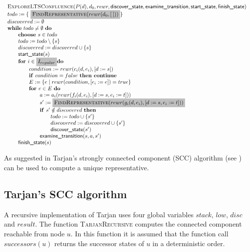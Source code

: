 \documentclass{article}
\newcommand{\emptylist}{\ensuremath{[\:]}}
\newcommand{\Space}{\text{\ }}
\newcommand{\If}{\text{\textbf{if }}}
\newcommand{\Do}{\text{\textbf{do }}}
\newcommand{\Then}{\text{\textbf{then }}}
\newcommand{\For}{\text{\textbf{for }}}
\newcommand{\Continue}{\text{\textbf{continue }}}
\newcommand{\Choose}{\text{\textbf{choose }}}
\begin{document}
\[
\begin{tabular}{l}
\textsc{ExploreLTSConfluence}($P(d), d_0, rewr, \textsf{discover\_state}, \textsf{examine\_transition},
\textsf{start\_state}, \textsf{finish\_state})$ \\
$todo := \{\ \colorbox{lightgray}{$\textsc{FindRepresentative}(rewr(d_0, \emptylist))$}\}$ \\
$discovered := \emptyset$ \\
\textbf{while} $todo \neq \emptyset $ \Do \\
\qquad \Choose $s \in todo$ \\
\qquad $todo := todo \setminus \{s\}$ \\
\qquad $discovered := discovered \cup \{s\}$ \\
\qquad $\textsf{start\_state}(s)$ \\
\qquad $\For i \in \colorbox{lightgray}{$I_{regular}$} \Do$ \\
\qquad \qquad $condition := rewr(c_i(d, e_i), [d := s])$ \\
\qquad \qquad $\If condition = false  \Space \Then \Continue$ \\
\qquad \qquad $E := \{ e \mid rewr(condition, [e_i := e]) = true \}$ \\
\qquad \qquad $\For e \in E  \Space \Do$ \\
\qquad \qquad \qquad $a := a_i(rewr(f_i(d,e_i), [d:=s,e_i:=t]))$ \\
\qquad \qquad \qquad $s' := \colorbox{lightgray}{$\textsc{FindRepresentative}(rewr(g_i(d,e_i), [d:=s,e_i:=t]))$}$ \\
\qquad \qquad \qquad $\If s' \notin discovered \Space \Then$ \\
\qquad \qquad \qquad \qquad $todo := todo \cup \{ s' \}$ \\
\qquad \qquad \qquad \qquad $discovered := discovered \cup \{s'\}$ \\
\qquad \qquad \qquad \qquad $\textsf{discover\_state}(s')$ \\
\qquad \qquad \qquad $\textsf{examine\_transition}(s, a, s')$ \\
\qquad $\textsf{finish\_state}(s)$
\end{tabular}
\]

As suggested in \cite{DBLP:conf/cav/BlomP02} Tarjan's strongly connected component (SCC) algorithm (see \cite{Tarjan72depthfirst}) can be used to compute a unique representative.

\subsection{Tarjan's SCC algorithm}
A recursive implementation of Tarjan uses four global variables $stack$, $low$, $disc$ and $result$. The function
\textsc{TarjanRecursive} computes the connected component reachable from node $u$. In this function it is assumed that the function call $successors(u)$ returns the successor states of $u$ in a deterministic order.
\end{document}
